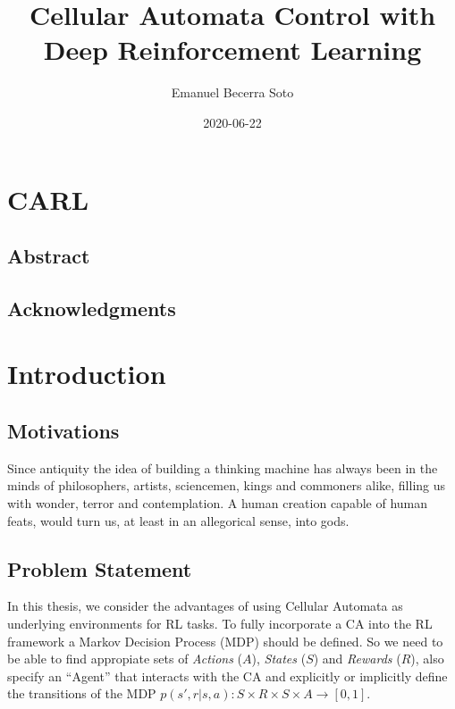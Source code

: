 \documentclass[
  openany]{book}
\title{Cellular Automata Control with Deep Reinforcement Learning}
\author{Emanuel Becerra Soto}
\date{2020-06-22}
\begin{document}
\maketitle

{
\setcounter{tocdepth}{1}
\tableofcontents
}
\listoftables
\listoffigures
\hypertarget{carl}{%
\chapter{CARL}\label{carl}}

\hypertarget{abstract}{%
\section{Abstract}\label{abstract}}

\hypertarget{acknowledgments}{%
\section{Acknowledgments}\label{acknowledgments}}

\hypertarget{introduction}{%
\chapter{Introduction}\label{introduction}}

\hypertarget{motivations}{%
\section{Motivations}\label{motivations}}

Since antiquity the idea of building a thinking machine has always been in the minds of philosophers, artists, sciencemen, kings and commoners alike, filling us with wonder, terror and contemplation. A human creation capable of human feats, would turn us, at least in an allegorical sense, into gods.

\hypertarget{problem-statement}{%
\section{Problem Statement}\label{problem-statement}}

In this thesis, we consider the advantages of using Cellular Automata as underlying environments for RL tasks. To fully incorporate a CA into the RL framework a Markov Decision Process (MDP) should be defined. So we need to be able to find appropiate sets of \emph{Actions} (\(A\)), \emph{States} (\(S\)) and \emph{Rewards} (\(R\)), also specify an ``Agent'' that interacts with the CA and explicitly or implicitly define the transitions of the MDP \(p(s',r|s,a): S \times R \times S \times A \rightarrow [0,1]\).
\end{document}
